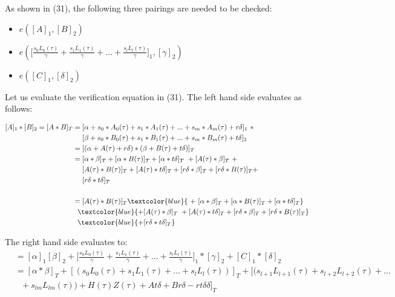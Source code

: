 As shown in (31), the following three pairings are needed to be checked:

\begin{itemize}
    \item \(e([A]_1, [B]_2)\)
    \item \begin{math}
        e(\bigl[\frac{s_0L_0(\tau)}{\gamma}+ \frac{s_1L_1(\tau)}{\gamma} + ... + \frac{s_lL_l(\tau)}{\gamma}\bigr]_1 , [\gamma]_2)
    \end{math}
    \item \begin{math}
        e([C]_1, [\delta]_2)
    \end{math}
\end{itemize}

Let us evaluate the verification equation in (31). The left hand side evaluates as follows:

\begin{equation*}
\begin{split}
    [A]_1 * [B]_2 = [A*B]_T &= [\alpha + s_0*A_0(\tau) + s_1*A_1(\tau) + ... + s_m*A_m(\tau) + r\delta]_1 \ *\\
    &\ \ \ \ [\beta + s_0*B_0(\tau) + s_1*B_1(\tau) + ... + s_m*B_m(\tau) + t\delta]_2 \\
    &= [(\alpha + A(\tau) + r\delta) * (\beta + B(\tau) + t\delta)]_T\\
    &= [\alpha * \beta]_T + [\alpha * B(\tau)]_T + [\alpha * t\delta]_T \ + [A(\tau) * \beta]_T \ + \\
    &\ \ \ \ [A(\tau) * B(\tau)]_T + [A(\tau) * t\delta]_T + [r\delta * \beta]_T + [r\delta * B(\tau)]_T +\\
    &\ \ \ \ [r\delta * t\delta]_T \\
    \\
    &= [A(\tau) * B(\tau)]_T \textcolor{blue}{\ +\ [\alpha * \beta]_T + [\alpha * B(\tau)]_T + [\alpha * t\delta]_T} \\
    &\ \ \textcolor{blue}{+ [A(\tau) * \beta]_T \ + [A(\tau) * t\delta]_T + [r\delta * \beta]_T + [r\delta * B(\tau)]_T} \\
    &\ \ \textcolor{blue}{+ [r\delta * t\delta]_T}
\end{split}
\end{equation*}

The right hand side evaluates to:
 \begin{equation*}
     \begin{split}
    &=[\alpha]_1[\beta]_2 + \bigl[\frac{s_0L_0(\tau)}{\gamma}+ \frac{s_1L_1(\tau)}{\gamma} + ... + \frac{s_lL_l(\tau)}{\gamma}\bigr]_1 * [\gamma]_2 + [C]_1 * [\delta]_2 \\
    &=[\alpha * \beta]_T + [(s_0L_0(\tau) + s_1L_1(\tau) + ... + s_lL_l(\tau))]_T + [(s_{l+1}L_{l+1}(\tau) + s_{l+2}L_{l+2}(\tau) + ... \\
    &\ \ \ + s_{lm}L_{lm}(\tau)) + H(\tau)Z(\tau) + At\delta + Br\delta - rt\delta\delta]_T
     \end{split}
 \end{equation*}

